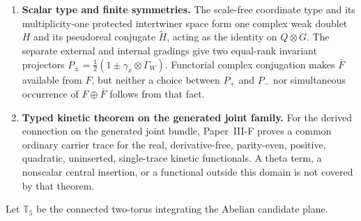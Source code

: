 \documentclass[12pt,a4paper]{article}
\begin{document}
\begin{definition}
\begin{enumerate}[label=(\roman*), leftmargin=2.2em]
      \(\mathbb R(T_R^3+\tfrac12(B-L))\).  The generated parent quadratic has
      a nonzero projected component in \((L_0^*)^{\otimes2}\) with weight
      \((-1,+2)\); Proposition~\ref{p5:prop:v187-pcad-yfix} below applies PCAD
      to that parent relation and identifies this kernel with the physical
      structural Abelian subgroup.
\item \textbf{Scalar type and finite symmetries.}  The scale-free coordinate type and
      its multiplicity-one protected intertwiner space form one complex weak
      doublet \(H\) and its pseudoreal conjugate \(\widetilde H\), acting as
      the identity on \(Q\otimes G\).  The separate external and internal
      gradings give two equal-rank invariant projectors
      \(P_\pm=\tfrac12(1\pm\gamma_x\otimes\Gamma_W)\).  Functorial complex
      conjugation makes \(\bar F\) available from \(F\), but neither a choice
      between \(P_+\) and \(P_-\) nor simultaneous occurrence of
      \(F\oplus\bar F\) follows from that fact.
\item \textbf{Typed kinetic theorem on the generated joint family.}  For the
      derived connection on the generated joint bundle, Paper~III-F proves a common ordinary
      carrier trace for the real, derivative-free, parity-even, positive,
      quadratic, uninserted, single-trace kinetic functionals.  A theta term,
      a nonscalar central insertion, or a functional outside this domain is
      not covered by that theorem.
\end{enumerate}

Let \(\mathbb T_5\) be the connected two-torus integrating the Abelian
candidate plane.


\end{definition}
\end{document}
